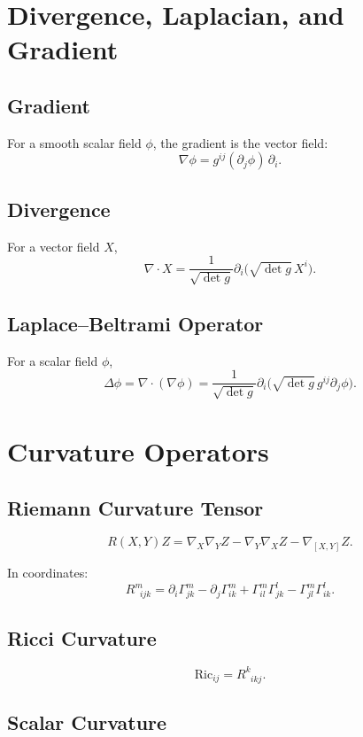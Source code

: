\section{Divergence, Laplacian, and Gradient}

\subsection{Gradient}

For a smooth scalar field $\phi$, the gradient is the vector field:
\[
\nabla \phi = g^{ij} (\partial_j \phi)\, \partial_i.
\]

\subsection{Divergence}

For a vector field $X$,
\[
\nabla \cdot X = \frac{1}{\sqrt{\det g}}
  \partial_i \bigl(\sqrt{\det g}\, X^i \bigr).
\]

\subsection{Laplace–Beltrami Operator}

For a scalar field $\phi$,
\[
\Delta \phi = \nabla \cdot (\nabla \phi)
  = \frac{1}{\sqrt{\det g}}
    \partial_i\bigl(\sqrt{\det g}\, g^{ij}\partial_j \phi \bigr).
\]

\section{Curvature Operators}

\subsection{Riemann Curvature Tensor}

\[
R(X,Y)Z = \nabla_X\nabla_Y Z - \nabla_Y\nabla_X Z - \nabla_{[X,Y]} Z.
\]

In coordinates:
\[
R^m_{\;\;ijk}
= \partial_i\Gamma^m_{jk}
  - \partial_j\Gamma^m_{ik}
  + \Gamma^m_{il}\Gamma^l_{jk}
  - \Gamma^m_{jl}\Gamma^l_{ik}.
\]

\subsection{Ricci Curvature}

\[
\mathrm{Ric}_{ij} = R^k_{\;\;ikj}.
\]

\subsection{Scalar Curvature}

